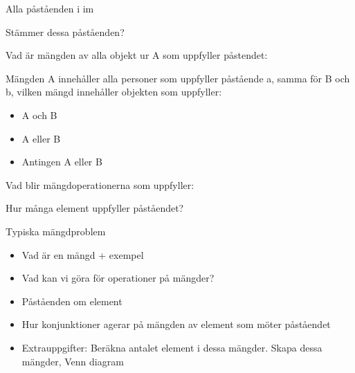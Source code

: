 \begin{problem}
	Alla påståenden i im
\end{problem}

\begin{problem}
	Stämmer dessa påståenden?
\end{problem}

\begin{problem}
	Vad är mängden av alla objekt ur A som uppfyller påstendet:
\end{problem}

\begin{problem}
	Mängden A innehåller alla personer som uppfyller påstående a, samma för B och b, vilken mängd innehåller objekten som uppfyller:
	\begin{itemize}
		\item A och B
		\item A eller B
		\item Antingen A eller B
	\end{itemize}
\end{problem}

\begin{problem}
	Vad blir mängdoperationerna som uppfyller:
\end{problem}

\begin{problem}
	Hur många element uppfyller påståendet?
\end{problem}

\begin{problem}[Extra]
	Typiska mängdproblem
\end{problem}








\begin{itemize}
	\item Vad är en mängd + exempel
	\item Vad kan vi göra för operationer på mängder?
	\item Påståenden om element
	\item Hur konjunktioner agerar på mängden av element som möter påståendet
	\item Extrauppgifter: Beräkna antalet element i dessa mängder. Skapa dessa mängder, Venn diagram
\end{itemize}
